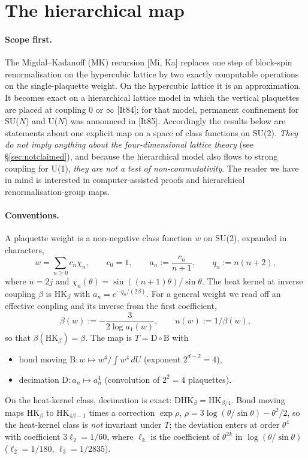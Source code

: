 \documentclass[11pt,a4paper]{article}
\theoremstyle{definition}
\theoremstyle{remark}
\newcommand{\HK}{\mathrm{HK}}
\begin{document}
\section{The hierarchical map}\label{sec:map}

\paragraph{Scope first.}
The Migdal--Kadanoff (MK) recursion [Mi, Ka] replaces one step of block-spin renormalisation on the hypercubic lattice by two exactly computable operations on the single-plaquette weight.
On the hypercubic lattice it is an approximation.
It becomes exact on a hierarchical lattice model in which the vertical plaquettes are placed at coupling $0$ or $\infty$ [It84]; for that model, permanent confinement for SU($N$) and U($N$) was announced in [It85].
Accordingly the results below are statements about one explicit map on a space of class functions on SU(2).
\emph{They do not imply anything about the four-dimensional lattice theory} (see \S\ref{sec:notclaimed}), and because the hierarchical model also flows to strong coupling for U(1), \emph{they are not a test of non-commutativity}.
The reader we have in mind is interested in computer-assisted proofs and hierarchical renormalisation-group maps.

\paragraph{Conventions.}
A plaquette weight is a non-negative class function $w$ on SU(2), expanded in characters,
\[
w=\sum_{n\ge0}c_n\chi_n,\qquad c_0=1,\qquad a_n:=\frac{c_n}{n+1},\qquad q_n:=n(n+2),
\]
where $n=2j$ and $\chi_n(\theta)=\sin((n+1)\theta)/\sin\theta$.
The heat kernel at inverse coupling $\beta$ is $\HK_\beta$ with $a_n=e^{-q_n/(2\beta)}$.
For a general weight we read off an effective coupling and its inverse from the first coefficient,
\[
\beta(w):=-\frac{3}{2\log a_1(w)},\qquad u(w):=1/\beta(w),
\]
so that $\beta(\HK_\beta)=\beta$.
The map is $T=\mathrm{D}\circ\mathrm{B}$ with
\begin{itemize}[nosep]
\item bond moving $\mathrm{B}:w\mapsto w^4/\!\int w^4\,dU$ (exponent $2^{d-2}=4$),
\item decimation $\mathrm{D}:a_n\mapsto a_n^4$ (convolution of $2^2=4$ plaquettes).
\end{itemize}
On the heat-kernel class, decimation is exact: $\mathrm{D}\HK_{\beta}=\HK_{\beta/4}$.
Bond moving maps $\HK_\beta$ to $\HK_{4\beta-1}$ times a correction $\exp\rho$, $\rho=3\log(\theta/\sin\theta)-\theta^2/2$, so the heat-kernel class is \emph{not} invariant under $T$; the deviation enters at order $\theta^4$ with coefficient $3\ell_2=1/60$, where $\ell_k$ is the coefficient of $\theta^{2k}$ in $\log(\theta/\sin\theta)$ ($\ell_2=1/180$, $\ell_3=1/2835$).
\end{document}

